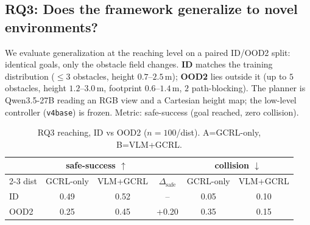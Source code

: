 
\newcommand{\AsafeID}{0.49}   %
\newcommand{\BsafeID}{0.52}   %
\newcommand{\AsafeOOD}{0.25}  %
\newcommand{\BsafeOOD}{0.45}  %
\newcommand{\AcollID}{0.05}   %
\newcommand{\BcollID}{0.10}   %
\newcommand{\AcollOOD}{0.35}  %
\newcommand{\BcollOOD}{0.15}  %
\newcommand{\nobsID}{2.6}     %
\newcommand{\nobsOOD}{4.0}    %
\newcommand{\deltaOOD}{+0.20} %
\newcommand{\retention}{0.87} %

\subsection{RQ3: Does the framework generalize to novel environments?}\label{subsec:rq3}

We evaluate generalization at the reaching level on a paired ID/OOD2 split: identical goals,
only the obstacle field changes. \textbf{ID} matches the training distribution
($\leq 3$ obstacles, height $0.7$--$2.5$\,m); \textbf{OOD2} lies outside it
(up to $5$ obstacles, height $1.2$--$3.0$\,m, footprint $0.6$--$1.4$\,m, $2$ path-blocking).
The planner is Qwen3.5-27B reading an RGB view and a Cartesian height map; the low-level
controller (\texttt{v4base}) is frozen. Metric: safe-success (goal reached, zero collision).

\begin{table}[t]\centering
\caption{RQ3 reaching, ID vs OOD2 ($n{=}100$/dist). A=GCRL-only, B=VLM+GCRL.}
\label{tab:rq3-ood2}
\begin{tabular}{lccccc}
\toprule
 & \multicolumn{2}{c}{safe-success $\uparrow$} & & \multicolumn{2}{c}{collision $\downarrow$} \\
\cmidrule{2-3}\cmidrule{5-6}
dist & GCRL-only & VLM+GCRL & $\Delta_{\text{safe}}$ & GCRL-only & VLM+GCRL \\
\midrule
ID   & \AsafeID  & \BsafeID  & --        & \AcollID  & \BcollID  \\
OOD2 & \AsafeOOD & \BsafeOOD & \deltaOOD & \AcollOOD & \BcollOOD \\
\bottomrule
\end{tabular}
\end{table}


